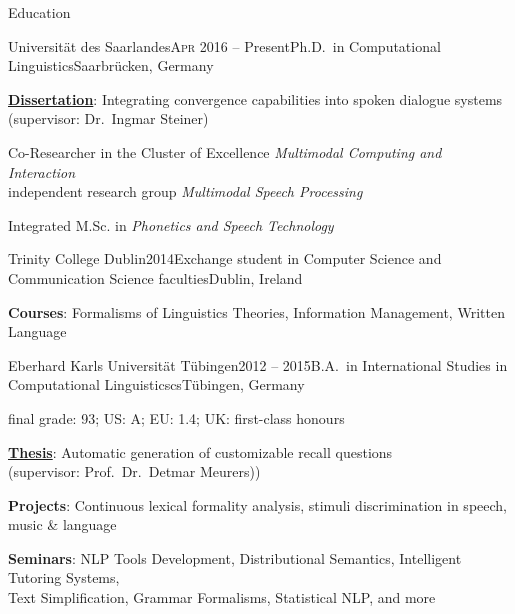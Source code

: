 \documentclass{resume} %
\begin{document}
\begin{rSection}{Education}

\begin{rSubsection}{Universität des Saarlandes}{\textsc{Apr} 2016 -- Present}{Ph.D.\ in Computational Linguistics}{Saarbrücken, Germany} %
	\setlength{\itemindent}{.7cm}
		
	\item \textbf{\underline{Dissertation}}: Integrating convergence capabilities into spoken dialogue systems \\\hspace*{.7cm}(supervisor: Dr.\ Ingmar Steiner)

	\item Co-Researcher in the Cluster of Excellence \textit{Multimodal Computing and Interaction}
	\\\hspace*{.7cm}independent research group \textit{Multimodal Speech Processing}
	
	\item Integrated M.Sc. in \textit{Phonetics and Speech Technology}
\end{rSubsection}

\begin{rSubsection}{Trinity College Dublin}{2014}{Exchange student in Computer Science and Communication Science faculties}{Dublin, Ireland}
	\setlength{\itemindent}{.7cm}
	
	\item \textbf{Courses}: Formalisms of Linguistics Theories, Information Management, Written Language
	
\end{rSubsection}

\begin{rSubsection}{Eberhard Karls Universität Tübingen}{2012 -- 2015}{B.A.\ in International Studies in Computational Linguisticscs}{Tübingen, Germany}
	
\vspace*{-.2cm}
\item[]{\footnotesize final grade: 93; US: A; EU: 1.4; UK: first-class honours}
\vspace*{.2cm}

	\setlength{\itemindent}{.7cm}
	
	\item \textbf{\underline{Thesis}}: Automatic generation of customizable recall questions
	\\\hspace*{.7cm}(supervisor: Prof.\ Dr.\ Detmar Meurers))
	
	\item \textbf{Projects}: Continuous lexical formality analysis, stimuli discrimination in speech, music \& language
	
	\item \textbf{Seminars}: NLP Tools Development, Distributional Semantics, Intelligent Tutoring Systems, \\\hspace*{.7cm}Text Simplification, Grammar Formalisms, Statistical NLP, and more
\end{rSubsection}

\end{rSection}
\end{document}
